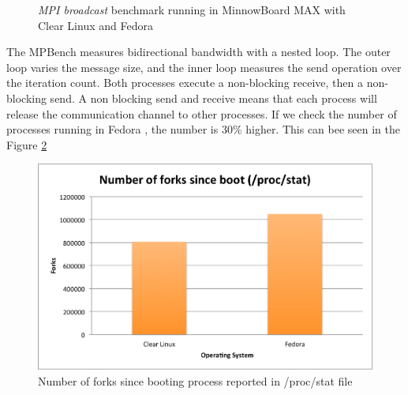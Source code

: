 \begin{figure}[H]
\begin{center}
\end{center}
\caption{\textit{MPI broadcast} benchmark running in  MinnowBoard MAX with Clear Linux and
Fedora}
\label{mpi_broadcast_clr_fedora}
\end{figure}

The MPBench measures bidirectional bandwidth with a nested loop. The outer loop
varies the message size, and the inner loop measures the send operation over
the iteration count. Both processes execute a non-blocking receive, then a
non-blocking send.  A non blocking send and receive means that each process
will release the communication channel to other processes. If we check the
number of processes running in Fedora , the number is 30\% higher. This can bee
seen in the Figure \ref{number_forks_fedora_clr}

\begin{figure}[H]
\centering
\includegraphics[width=1 \textwidth]{images/number_forks.png}
\caption{Number of forks since booting process reported in /proc/stat file }
\label{number_forks_fedora_clr}
\end{figure}

